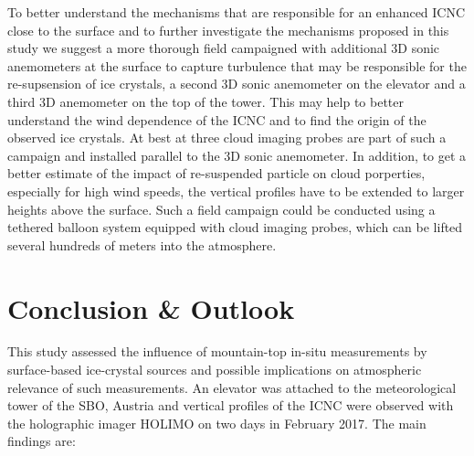 \documentclass[draft,linenumbers]{agujournal}
\begin{document}
To better understand the mechanisms that are responsible for an enhanced ICNC close to the surface and to further investigate the mechanisms proposed in this study we suggest a more thorough field campaigned with additional 3D sonic anemometers at the surface to capture turbulence that may be responsible for the re-supsension of ice crystals, a second 3D sonic anemometer on the elevator and a third 3D anemometer on the top of the tower. This may help to better understand the wind dependence of the ICNC and to find the origin of the observed ice crystals. At best at three cloud imaging probes are part of such a campaign and installed parallel to the 3D sonic anemometer. In addition, to get a better estimate of the impact of re-suspended particle on cloud porperties, especially for high wind speeds, the vertical profiles have to be extended to larger heights above the surface. Such a field campaign could be conducted using a tethered balloon system equipped with cloud imaging probes, which can be lifted several hundreds of meters into the atmosphere.

\section{Conclusion & Outlook}
This study assessed the influence of mountain-top in-situ measurements by surface-based ice-crystal sources and possible implications on atmospheric relevance of such measurements. An elevator was attached to the meteorological tower of the SBO, Austria and vertical profiles of the ICNC were observed with the holographic imager HOLIMO on two days in February 2017. The main findings are:
\end{document}
